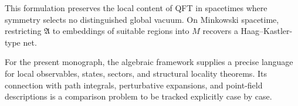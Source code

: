 This formulation preserves the local content of QFT in spacetimes where
symmetry selects no distinguished global vacuum.  On Minkowski spacetime,
restricting \(\mathfrak A\) to embeddings of suitable regions into \(M\)
recovers a Haag--Kastler-type net.

For the present monograph, the algebraic framework supplies a precise language
for local observables, states, sectors, and structural locality theorems.  Its
connection with path integrals, perturbative expansions, and point-field
descriptions is a comparison problem to be tracked explicitly case by case.
